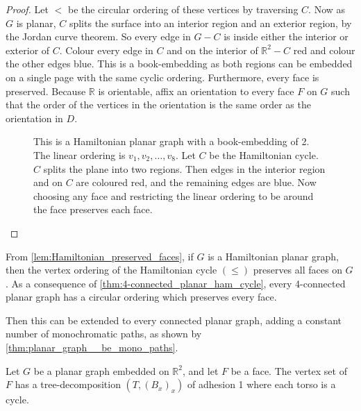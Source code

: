 \begin{proof}
	Let \(<\) be the circular ordering of these vertices by traversing \(C\). Now as \(G\) is planar, \(C\) splits the surface into an interior region and an exterior region, by the Jordan curve theorem. So every edge in $G - C$ is inside either the interior or exterior of \(C\). Colour every edge in $C$ and on the interior of $\mathbb{R}^2 - C$ red and colour the other edges blue. This is a book-embedding as both regions can be embedded on a single page with the same cyclic ordering. Furthermore, every face is preserved. Because $\mathbb{R}$ is orientable, affix an orientation to every face \(F\) on $G$ such that the order of the vertices in the orientation is the same order as the orientation in \(D\).
	\begin{figure}[h!]
		\centering
		
		\caption[Hamiltonian planar graph]{This is a Hamiltonian planar graph with a book-embedding of 2. The linear ordering is $v_1, v_2, \ldots,  v_8$. Let $C$ be the Hamiltonian cycle. $C$ splits the plane into two regions. Then edges in the interior region and on $C$ are coloured red, and the remaining edges are blue. Now choosing any face and restricting the linear ordering to be around the face preserves each face. }\label{fig:hamiltonian_planar}
	\end{figure}
\end{proof}
From \cref{lem:Hamiltonian_preserved_faces}, if \(G\) is a Hamiltonian planar graph, then the vertex ordering of the Hamiltonian cycle \((\leq)\) preserves all faces on \(G\). As a consequence of \cref{thm:4-connected_planar_ham_cycle}, every 4-connected planar graph has a circular ordering which preserves every face.

Then this can be extended to every connected planar graph, adding a constant number of monochromatic paths, as shown by \cref{thm:planar_graph__be_mono_paths}.

\begin{lemma}\label{lemma:decomposition_faces}
	Let $G$ be a planar graph embedded on $\mathbb{R}^2$, and let $F$ be a face. The vertex set of $F$ has a tree-decomposition $(T, (B_x)_x)$ of adhesion 1 where each torso is a cycle.
\end{lemma}

